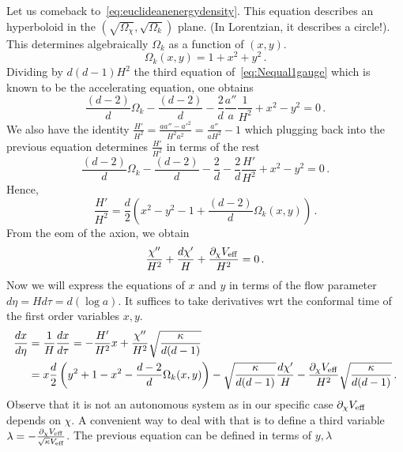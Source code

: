 \documentclass[a4paper]{article}
\begin{document}
Let us comeback to~\eqref{eq:euclideanenergydensity}. This equation describes an hyperboloid in the $\left(\sqrt{\Omega_\chi},\sqrt{\Omega_k}\right)$ plane. (In Lorentzian, it describes a circle!). This determines algebraically $\Omega_k$ as a function of $(x,y)$.
\begin{equation}
  \Omega_k(x,y) = 1+ x^2 + y^2\,.
\end{equation}
Dividing by $d(d-1)H^2$ the third equation of~\eqref{eq:Nequal1gauge} which is known to be the accelerating equation, one obtains
\begin{equation}
  \frac{(d-2)}{d}\Omega_k - \frac{(d-2)}{d}-\frac{2}{d}\frac{a''}{a}\frac{1}{H^2}+x^2-y^2=0\,.
\end{equation}
We also have the identity $\frac{H'}{H^2} =\frac{a a''-a'^2}{H^2 a^2} = \frac{a''}{aH^2} -1$ which plugging back into the previous equation determines $\frac{H'}{H^2}$ in terms of the rest 
\begin{equation}
  \frac{(d-2)}{d}\Omega_k - \frac{(d-2)}{d}-\frac{2}{d}-\frac{2}{d}\frac{H'}{H^2}+x^2-y^2=0\,.
\end{equation}
Hence,
\begin{equation}
  \frac{H'}{H^2} = \frac{d}{2}\left(x^2-y^2-1+\frac{(d-2)}{d}\Omega_k(x,y)\right)\,.
\end{equation}
From the eom of the axion, we obtain
\begin{equation}
  \frac{\chi''}{H^2} + \frac{d\chi'}{H}+\frac{\partial_\chi V_{\rm eff}}{H^2}=0\,.
\end{equation} 
Now we will express the equations of $x$ and $y$ in terms of the flow parameter $d\eta = H d\tau = d(\log a)$. It suffices to take derivatives wrt the conformal time of the first order variables $x,y$.
\begin{equation}
  \begin{aligned}
    \frac{dx}{d\eta}&=\frac{1}{H}\frac{dx}{d\tau} = -\frac{H'}{H^2}x+\frac{\chi''}{H^2}\sqrt{\frac{\kappa}{d(d-1)}}\\
    &=x \frac{d}{2}\left(y^2+1-x^2-\frac{d-2}{d}\Omega_k(x,y)\right)-\sqrt{\frac{\kappa}{d(d-1)}}\frac{d\chi'}{H}-\frac{\partial_\chi V_{\rm eff}}{H^2}\sqrt{\frac{\kappa}{d(d-1)}}\,.
  \end{aligned}
\end{equation}
Observe that it is not an autonomous system as in our specific case $\partial_\chi V_{\rm eff}$ depends on $\chi$. A convenient way to deal with that is to define a third variable $\lambda = -\frac{\partial_\chi V_{\rm eff}}{\sqrt{\kappa}V_{\rm eff}}$. The previous equation can be defined in terms of $y,\lambda$
\end{document}
